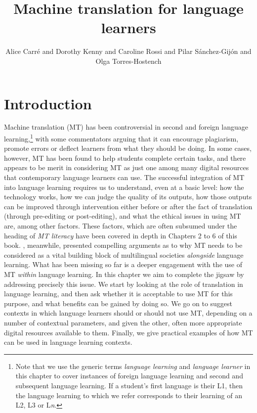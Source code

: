 \documentclass[output=paper,colorlinks,citecolor=brown,
]{langscibook}
\author{Alice Carré\affiliation{Université Grenoble-Alpes} and Dorothy Kenny\affiliation{Dublin City University} and Caroline Rossi\affiliation{Université Grenoble-Alpes} and  Pilar Sánchez-Gijón\affiliation{Universitat Autònoma de Barcelona} and Olga Torres-Hostench\affiliation{Universitat Autònoma de Barcelona}}
\title{Machine translation for language learners}
\begin{document}
\AffiliationsWithIndexing{}
\maketitle

\section{Introduction}\label{sec:carre:1}

Machine translation (MT) has been controversial in second and foreign language learning,\footnote{Note that we use the generic terms \textit{language learning} and \textit{language learner} in this chapter to cover instances of foreign language learning and second and subsequent language learning. If a student’s first language is their L1, then the language learning to which we refer corresponds to their learning of an L2, L3 or L\textit{n}.}  with some commentators arguing that it can encourage plagiarism, promote errors or deflect learners from what they should be doing. In some cases, however, MT has been found to help students complete certain tasks, and there appears to be merit in considering MT as just one among many digital resources that contemporary language learners can use. The successful integration of MT into language learning requires us to understand, even at a basic level: how the technology works, how we can judge the quality of its outputs, how those outputs can be improved through intervention either before or after the fact of translation (through pre-editing or post-editing), and what the ethical issues in using MT are, among other factors. These factors, which are often subsumed under the heading of \textit{MT literacy} \citep{BowkerCiro2019} have been covered in depth in Chapters 2 to 6 of this book. , meanwhile, presented compelling arguments as to why MT needs to be considered as a vital building block of multilingual societies \textit{alongside} language learning. What has been missing so far is a deeper engagement with the use of MT \textit{within} language learning. In this chapter we aim to complete the jigsaw by addressing precisely this issue. We start by looking at the role of translation in language learning, and then ask whether it is acceptable to use MT for this purpose, and what benefits can be gained by doing so. We go on to suggest contexts in which language learners should or should not use MT, depending on a number of contextual parameters, and given the other, often more appropriate digital resources available to them. Finally, we give practical examples of how MT can be used in language learning contexts. 
\end{document}
